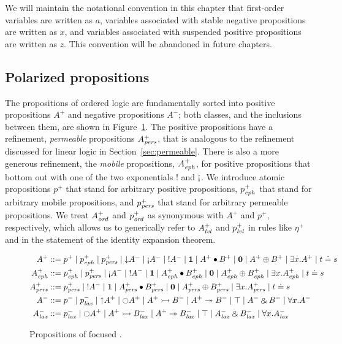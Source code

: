 We will maintain the notational convention in this chapter that
first-order variables are written as $a$, variables associated
with stable negative propositions are written as $x$, and variables
associated with suspended positive propositions are written as 
$z$. This convention will be abandoned in future chapters.

\subsection{Polarized propositions}

The propositions of ordered logic are fundamentally sorted into
positive propositions $A^+$ and negative propositions $A^-$; both
classes, and the inclusions between them, 
are shown in Figure~\ref{fig:ordered}. The
positive propositions have a refinement, {\it permeable} propositions
$A^+_{\it pers}$, that is analogous to the refinement discussed for linear
logic in Section~\ref{sec:permeable}. There is also a more generous
refinement, the {\it mobile} propositions, $A^+_{\it eph}$, for positive
propositions that bottom out with one of the two exponentials ${!}$ and
${\gnab}$. We introduce atomic propositions $p^+$ that stand for
arbitrary positive propositions, $p^+_{\it eph}$ that stand for arbitrary
mobile propositions, and $p^+_{\it pers}$ that stand for arbitrary
permeable propositions. We treat $A^+_{\it ord}$ and $p^+_{\it ord}$ as synonymous
with $A^+$ and $p^+$, respectively, which allows us to generically
refer to $A^+_{\it lvl}$ and $p^+_{\it lvl}$ in rules like $\eta^+$ and in the
statement of the identity expansion theorem.

\begin{figure}
\begin{align*}
A^+ & ::= p^+ \mid p^+_\meph \mid p^+_\mpers
        \mid {\downarrow}A^- \mid {\gnab}A^- \mid {!}A^- 
        \mid \one \mid A^+ \fuse B^+ \mid \zero \mid A^+ \oplus B^+ 
        \mid \exists x. A^+ \mid t \doteq s
\\
A^+_\meph & ::= p^+_\meph \mid p^+_\mpers
        \mid {\gnab}A^- \mid {!}A^- 
        \mid \one \mid A^+_\meph \fuse B^+_\meph
        \mid \zero \mid A^+_\meph \oplus B^+_\meph
        \mid \exists x. A^+_\meph \mid t \doteq s
\\
A^+_\mpers & ::= p^+_\mpers 
        \mid {!}A^- 
        \mid \one \mid A^+_\mpers \fuse B^+_\mpers 
        \mid \zero \mid A^+_\mpers \oplus B^+_\mpers
        \mid \exists x. A^+_\mpers \mid t \doteq s
\\
A^- & ::= p^- \mid p^-_\mlax 
        \mid {\uparrow}A^+ \mid {\ocircle}A^+
        \mid A^+ \lefti B^- \mid A^+ \righti B^-
        \mid \top \mid A^- \with B^-
        \mid \forall x.A^-
\\
A^-_\mlax & ::= p^-_\mlax 
        \mid {\ocircle}A^+
        \mid A^+ \lefti B^-_\mlax \mid A^+ \righti B^-_\mlax
        \mid \top \mid A^-_\mlax \with B^-_\mlax
        \mid \forall x.A^-_\mlax
\end{align*}
\caption{Propositions of focused \ollll.}
\label{fig:ordered}
\end{figure}

